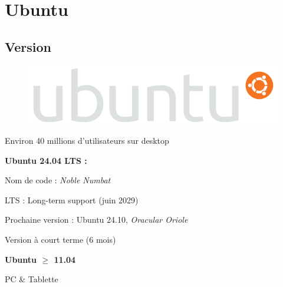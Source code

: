 \documentclass{beamer}
\begin{document}
\section{Ubuntu}
\subsection*{Version}
\begin{frame}

\begin{figure}
\includegraphics[width=0.55\linewidth]{images/Ubuntu_logo}
\end{figure}

Environ 40 millions d'utilisateurs sur desktop

\begin{block}{\bf Ubuntu 24.04 LTS :}

Nom de code : \textit{Noble Numbat}

LTS : Long-term support (juin 2029)


\end{block}


\begin{exampleblock}{Prochaine version :}
 Ubuntu 24.10, \textit{Oracular Oriole}
 
 Version à court terme (6 mois)
\end{exampleblock}

\end{frame}

\begin{frame}

  \begin{center}
    {\bf Ubuntu $\geq$ 11.04 }
  \end{center}

  \begin{center}
    PC \& Tablette
  \end{center}

\end{frame}
\end{document}
